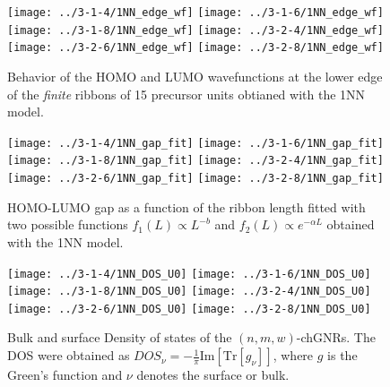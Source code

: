 \documentclass[amsmath,%
amssymb,prb,superscriptaddress]{revtex4}
\begin{document}
\begin{figure*}
	\texttt{[image: ../3-1-4/1NN\_edge\_wf]}
	\texttt{[image: ../3-1-6/1NN\_edge\_wf]}
	\texttt{[image: ../3-1-8/1NN\_edge\_wf]}
	\texttt{[image: ../3-2-4/1NN\_edge\_wf]}
	\texttt{[image: ../3-2-6/1NN\_edge\_wf]}
	\texttt{[image: ../3-2-8/1NN\_edge\_wf]}
	\caption{Behavior of the HOMO and LUMO wavefunctions at the lower edge of the \emph{finite} ribbons of 15 precursor units obtianed with the 1NN model.}
\end{figure*}

\begin{figure*}
	\texttt{[image: ../3-1-4/1NN\_gap\_fit]}
	\texttt{[image: ../3-1-6/1NN\_gap\_fit]}
	\texttt{[image: ../3-1-8/1NN\_gap\_fit]}
	\texttt{[image: ../3-2-4/1NN\_gap\_fit]}
	\texttt{[image: ../3-2-6/1NN\_gap\_fit]}
	\texttt{[image: ../3-2-8/1NN\_gap\_fit]}	
	\caption{HOMO-LUMO gap as a function of the ribbon length fitted with two possible functions $f_{1}(L) \propto L^{-b}$ and $f_{2}(L) \propto e^{-\alpha L}$ obtained with the 1NN model.}	
	\label{fig:gap-fit-length}		
\end{figure*}

\begin{figure*}
	\texttt{[image: ../3-1-4/1NN\_DOS\_U0]}
	\texttt{[image: ../3-1-6/1NN\_DOS\_U0]}
	\texttt{[image: ../3-1-8/1NN\_DOS\_U0]}
	\texttt{[image: ../3-2-4/1NN\_DOS\_U0]}
	\texttt{[image: ../3-2-6/1NN\_DOS\_U0]}
	\texttt{[image: ../3-2-8/1NN\_DOS\_U0]}
	\caption{Bulk and surface Density of states of the $(n,m,w)$-chGNRs. The DOS were obtained as $DOS_{\nu}=-\frac{1}{\pi}\mathrm{Im}\left[\mathrm{Tr}\left[ g_{\nu} \right]\right]$, where $g$ is the Green's function and $\nu$ denotes the surface or bulk.}		
\end{figure*}

% 
\end{document}
